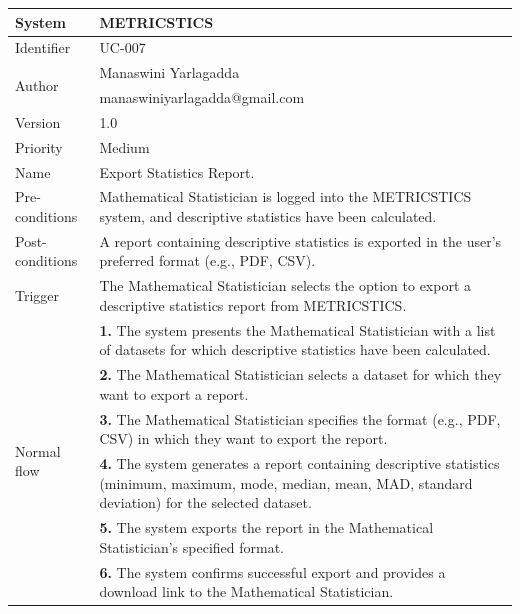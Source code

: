 \begin{table}[htb]
    \centering
    \begin{tabular}{|p{4cm}|p{12cm}|} \hline 
         System &  METRICSTICS\\ \hline 
         
         Identifier & UC-007 \\ \hline 
         
         \multirow{2}{*}{Author} & Manaswini Yarlagadda   \\
         &manaswiniyarlagadda@gmail.com \\
           \hline 
           Version & 1.0\\ \hline
         
         Priority &  Medium\\ \hline 
         
         Name & Export Statistics Report. \\ \hline 
         Pre-conditions & Mathematical Statistician is logged into the METRICSTICS system, and descriptive statistics have been calculated. \\ \hline 
         Post-conditions & A report containing descriptive statistics is exported in the user's preferred format (e.g., PDF, CSV).  \\ \hline
         Trigger & The Mathematical Statistician selects the option to export a descriptive statistics report from METRICSTICS. \\ \hline
        \multirow{6}{*}{Normal flow} 
        & \textbf{1.} The system presents the Mathematical Statistician with a list of datasets for which descriptive statistics have been calculated. \\ 
        & \textbf{2.} The Mathematical Statistician selects a dataset for which they want to export a report.   \\ 
 & \textbf{3.}  The Mathematical Statistician specifies the format (e.g., PDF, CSV) in which they want to export the report. \\ 
        & \textbf{4.}  The system generates a report containing descriptive statistics (minimum, maximum, mode, median, mean, MAD, standard deviation) for the selected dataset.   \\
 & \textbf{5.}   The system exports the report in the Mathematical Statistician's specified format. \\ 
        & \textbf{6.}  The system confirms successful export and provides a download link to the Mathematical Statistician.   \\
         

\end{tabular}
\end{table}
